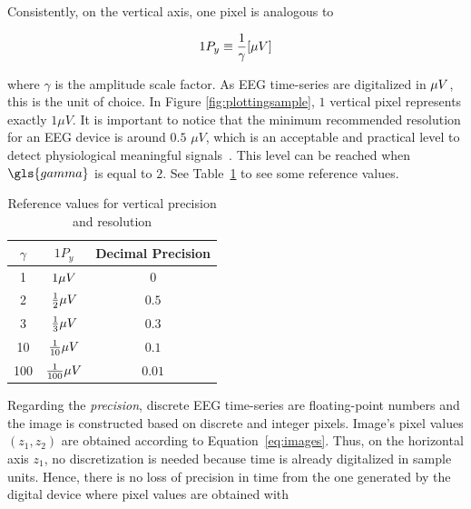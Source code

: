 Consistently, on the vertical axis, one pixel is analogous to 

\begin{equation}
1 P_y \equiv \frac{1}{\gamma}  [\si\mu{V}]
\label{eq:resolutiony}
\end{equation}

\noindent where $\gamma$ is the amplitude scale factor.  As EEG time-series are digitalized in $\si\mu{V}$, this is the unit of choice.  In Figure \ref{fig:plottingsample}, $1$ vertical pixel represents exactly $1 \mu V$.  It is important to notice that the minimum recommended resolution for an EEG device is around $0.5$ $\mu V$, which is an acceptable and practical level to detect physiological meaningful signals~\cite{Schomer2010}.  This level can be reached when $\gls{gamma}$ is equal to $2$.  See Table~\ref{tab:precisiony} to see some reference values.

\begin{table}[htb]
\caption[Reference Values for Vertical Precision and Resolution]{Reference values for vertical precision and resolution}
\centering
\vspace{8pt}
\begin{tabular}{|c|c|c|}
\toprule
\textbf{$\gamma$}	&  $1 P_y$ 	&  Decimal Precision   \\
\midrule
1     &     $1 \si\mu{V}$   &  $0$                                      \\
2    &     $\frac{1}{2} \si\mu{V}$   &  $0.5$         \\
3     &     $\frac{1}{3} \si\mu{V}$   &  $0.3$   \\
10     &     $\frac{1}{10} \si\mu{V}$   &  $0.1$         \\
100     &     $\frac{1}{100} \si\mu{V}$   &  $0.01$    \\
\bottomrule
\end{tabular}
\label{tab:precisiony}
\end{table}

Regarding the \textit{precision}, discrete EEG time-series are floating-point numbers and the image is constructed based on discrete and integer pixels.  Image's pixel values $(z_1,z_2)$ are obtained according to Equation~\ref{eq:images}.  Thus, on the horizontal axis $z_1$, no discretization is needed because time is already digitalized in sample units. Hence, there is no loss of precision in time from the one generated by the digital device where pixel values are obtained with


